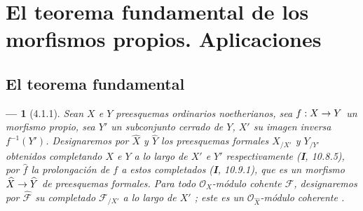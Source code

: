 \documentclass[10pt,oneside,openany]{book}
\theoremstyle{egaenv}\newtheorem*{env}{---}
\theoremstyle{egastatement}
\theoremstyle{egadescription}
\newcommand{\oldpage}[2][]{\marginnote{\normalfont\scriptsize\textbf{#1}\,|\,#2}\ignorespaces}
\renewcommand{\to}{\mathchoice{\longrightarrow}{\rightarrow}{\rightarrow}{\rightarrow}}
\begin{document}
\section{El teorema fundamental de los morfismos propios. Aplicaciones}
\label{section:III.4}
\label{section:III.4-fr}


\subsection{El teorema fundamental}
\label{subsection:III.4.1}
\label{subsection:III.4.1-fr}

\begin{env}[4.1.1]
\label{III.4.1.1}
\label{III.4.1.1-fr}
Sean $X$ e $Y$ preesquemas ordinarios noetherianos, sea $f:X\to Y$ un
morfismo \emph{propio}, sea $Y'$ un subconjunto cerrado de $Y$, $X'$ su imagen inversa
$f^{-1}(Y')$. Designaremos por $\widehat X$ y $\widehat Y$ los preesquemas formales
$X_{/X'}$ y $Y_{/Y'}$ \emph{obtenidos completando} $X$ e $Y$ a lo largo de
$X'$ e $Y'$ respectivamente (\textbf{I}, 10.8.5), por $\widehat f$ la \emph{prolongación}
de $f$ a estos completados (\textbf{I}, 10.9.1), que es un morfismo
$\widehat X\to\widehat Y$ de preesquemas formales. Para todo
$\mathcal O_X$-módulo \emph{cohente} $\mathcal F$,
\oldpage[III]{123}
designaremos por $\widehat{\mathcal F}$ su \emph{completado} $\mathcal F_{/X'}$ a lo
largo de $X'$ ; este es un
$\mathcal O_{\widehat X}$-módulo coherente .
\end{env}
\end{document}
